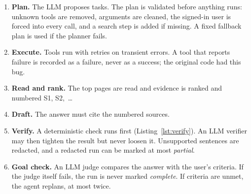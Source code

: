 \documentclass[11pt,a4paper]{article}
\begin{document}
\begin{enumerate}
  \item \textbf{Plan.} The LLM proposes tasks. The plan is validated before anything runs: unknown tools are removed, arguments are cleaned, the signed-in user is forced into every call, and a search step is added if missing. A fixed fallback plan is used if the planner fails.
  \item \textbf{Execute.} Tools run with retries on transient errors. A tool that reports failure is recorded as a failure, never as a success; the original code had this bug.
  \item \textbf{Read and rank.} The top pages are read and evidence is ranked and numbered S1, S2,~\ldots
  \item \textbf{Draft.} The answer must cite the numbered sources.
  \item \textbf{Verify.} A deterministic check runs first (Listing~\ref{lst:verify}). An LLM verifier may then tighten the result but never loosen it. Unsupported sentences are redacted, and a redacted run can be marked at most \emph{partial}.
  \item \textbf{Goal check.} An LLM judge compares the answer with the user's criteria. If the judge itself fails, the run is never marked \emph{complete}. If criteria are unmet, the agent replans, at most twice.
\end{enumerate}
\end{document}
